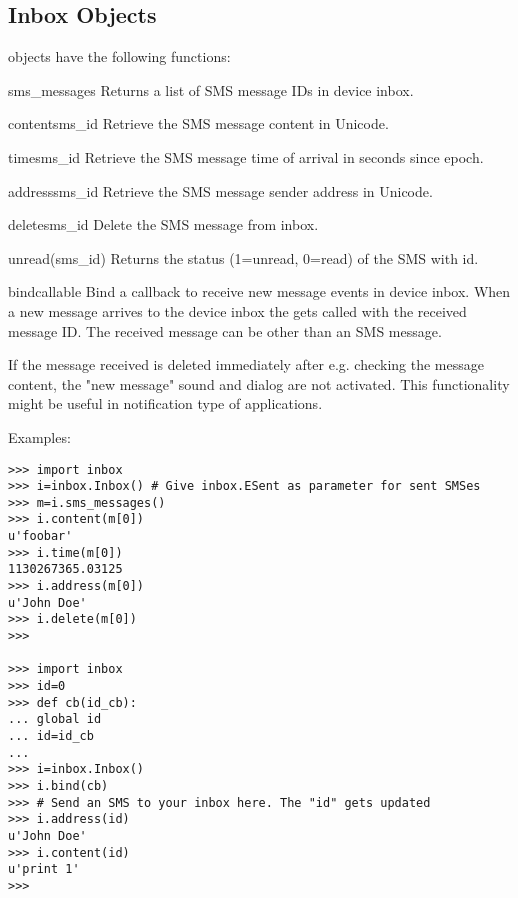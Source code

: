 \subsection{Inbox Objects}
\label{subsec:inbox}

 objects have the following functions:

\begin{methoddesc}[Inbox]{sms_messages}{}
Returns a list of SMS message IDs in device inbox.
\end{methoddesc}

\begin{methoddesc}[Inbox]{content}{sms_id}
Retrieve the SMS message content in Unicode. 
\end{methoddesc}

\begin{methoddesc}[Inbox]{time}{sms_id}
Retrieve the SMS message time of arrival in seconds since epoch. 
\end{methoddesc}

\begin{methoddesc}[Inbox]{address}{sms_id}
Retrieve the SMS message sender address in Unicode. 
\end{methoddesc}

\begin{methoddesc}[Inbox]{delete}{sms_id}
Delete the SMS message from inbox.
\end{methoddesc}

\begin{methoddesc}[Inbox]{unread}(sms_id)
Returns the status (1=unread, 0=read) of the SMS with id.
\end{methoddesc}

\begin{methoddesc}[Inbox]{bind}{callable}
Bind a callback to receive new message events in device inbox. When a new 
message arrives to the device inbox the  gets 
called with the received message ID. The received message can be other than 
an SMS message.

If the message received is deleted immediately after e.g. checking the message 
content, the "new message" sound and dialog are not activated. This 
functionality might be useful in notification type of applications. 
\end{methoddesc}

Examples:
\begin{verbatim}
>>> import inbox
>>> i=inbox.Inbox() # Give inbox.ESent as parameter for sent SMSes
>>> m=i.sms_messages()
>>> i.content(m[0])
u'foobar'
>>> i.time(m[0])
1130267365.03125
>>> i.address(m[0])
u'John Doe'
>>> i.delete(m[0])
>>>

>>> import inbox 
>>> id=0 
>>> def cb(id_cb): 
... global id 
... id=id_cb
... 
>>> i=inbox.Inbox()
>>> i.bind(cb)
>>> # Send an SMS to your inbox here. The "id" gets updated
>>> i.address(id)
u'John Doe'
>>> i.content(id)
u'print 1'
>>>
\end{verbatim}
